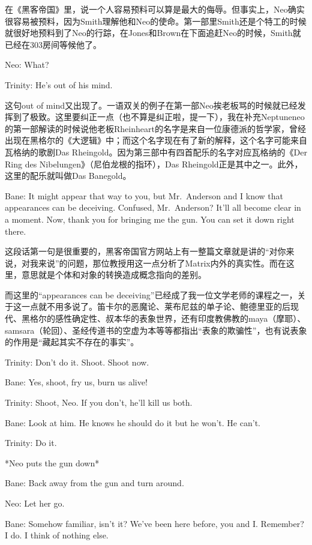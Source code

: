 \documentclass[UTF8]{ctexart}
\newenvironment{myquote}{\color{green} \setlength{\leftskip}{6em} \setlength{\rightskip}{4em} \setlength{\parindent}{-2em}}{\par}
\begin{document}
在《黑客帝国》里，说一个人容易预料可以算是最大的侮辱。但事实上，Neo确实很容易被预料，因为Smith理解他和Neo的使命。第一部里Smith还是个特工的时候就很好地预料到了Neo的行踪，在Jones和Brown在下面追赶Neo的时候，Smith就已经在303房间等候他了。

\begin{myquote}
Neo: What?

Trinity: He's out of his mind.
\end{myquote}

这句out of mind又出现了。一语双关的例子在第一部Neo挨老板骂的时候就已经发挥到了极致。这里要纠正一点（也不算是纠正啦，提一下），我在补充Neptuneneo的第一部解读的时候说他老板Rheinheart的名字是来自一位康德派的哲学家，曾经出现在黑格尔的《大逻辑》中；而这个名字现在有了新的解释，这个名字可能来自瓦格纳的歌剧Das Rheingold。因为第三部中有四首配乐的名字对应瓦格纳的《Der Ring des Nibelungen》（尼伯龙根的指环），Das Rheingold正是其中之一。此外，这里的配乐就叫做Das Banegold。

\begin{myquote}
Bane: It might appear that way to you, but Mr.~Anderson and I know that appearances can be deceiving. Confused, Mr.~Anderson? It'll all become clear in a moment. Now, thank you for bringing me the gun. You can set it down right there.
\end{myquote}

这段话第一句是很重要的，黑客帝国官方网站上有一整篇文章就是讲的“对你来说，对我来说”的问题，那位教授用这一点分析了Matrix内外的真实性。而在这里，意思就是个体和对象的转换造成概念指向的差别。

而这里的“appearances can be deceiving”已经成了我一位文学老师的课程之一，关于这一点就不用多说了。笛卡尔的恶魔论、莱布尼兹的单子论、鲍德里亚的后现代、黑格尔的感性确定性、叔本华的表象世界，还有印度教佛教的maya（摩耶）、samsara（轮回）、圣经传道书的空虚为本等等都指出“表象的欺骗性”，也有说表象的作用是“藏起其实不存在的事实”。

\begin{myquote}
Trinity: Don't do it. Shoot. Shoot now.

Bane: Yes, shoot, fry us, burn us alive!

Trinity: Shoot, Neo. If you don't, he'll kill us both.

Bane: Look at him. He knows he should do it but he won't. He can't.

Trinity: Do it.

*Neo puts the gun down*

Bane: Back away from the gun and turn around.

Neo: Let her go.

Bane: Somehow familiar, isn't it? We've been here before, you and I. Remember? I do. I think of nothing else.
\end{myquote}
\end{document}
